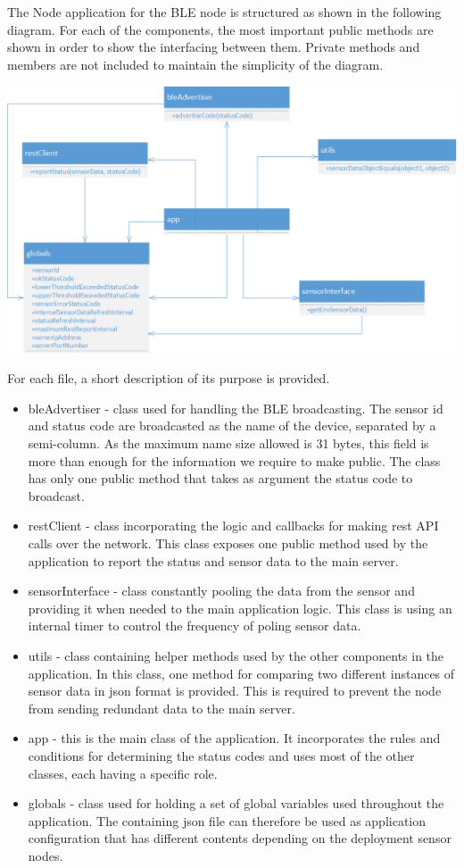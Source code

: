 The Node application for the BLE node is structured as shown in the following diagram. For each of the components, the most important public methods are shown in order to show the interfacing between them. Private methods and members are not included to maintain the simplicity of the diagram.

\bigskip
\includegraphics[scale=0.6]{gfx/bleNode_architecture} 
\bigskip

For each file, a short description of its purpose is provided.
\begin{itemize}
\item bleAdvertiser - class used for handling the BLE broadcasting. The sensor id and status code are broadcasted as the name of the device, separated by a semi-column. As the maximum name size allowed is 31 bytes, this field is more than enough for the information we require to make public. The class has only one public method that takes as argument the status code to broadcast.
\item restClient - class incorporating the logic and callbacks for making rest API calls over the network. This class exposes one public method used by the application to report the status and sensor data to the main server.
\item sensorInterface - class constantly pooling the data from the sensor and providing it when needed to the main application logic. This class is using an internal timer to control the frequency of poling sensor data.
\item utils - class containing helper methods used by the other components in the application. In this class, one method for comparing two different instances of sensor data in json format is provided. This is required to prevent the node from sending redundant data to the main server.
\item app - this is the main class of the application. It incorporates the rules and conditions for determining the status codes and uses most of the other classes, each having a specific role.
\item globals - class used for holding a set of global variables used throughout the application. The containing json file can therefore be used as application configuration that has different contents depending on the deployment sensor nodes.
\end{itemize}

